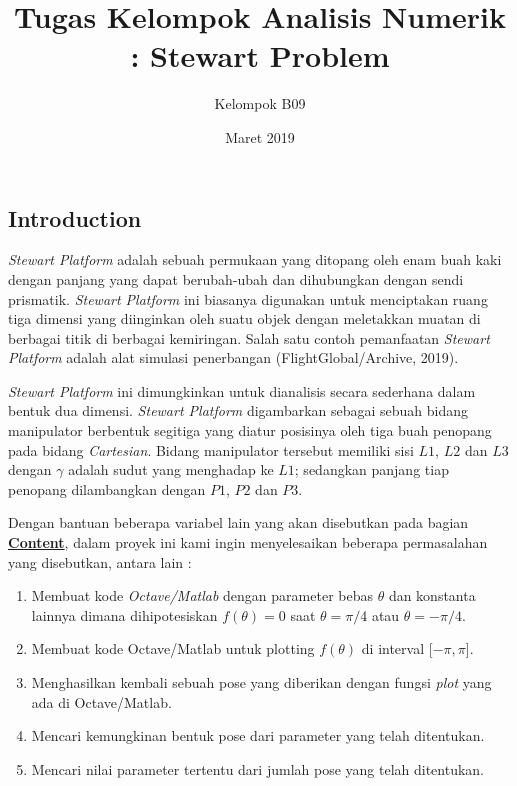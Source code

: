 \documentclass[11pt]{article}
\begin{document}
\author{Kelompok B09}
\title{Tugas Kelompok Analisis Numerik : Stewart Problem}
\date{Maret 2019}
\maketitle
\medskip

\begin{multicols}{2}
\section{Introduction}
\label{sec:Intro}
\textit{Stewart Platform} adalah sebuah permukaan yang ditopang oleh enam buah kaki dengan panjang yang dapat berubah-ubah dan dihubungkan dengan sendi prismatik. \textit{Stewart Platform} ini biasanya digunakan untuk menciptakan ruang tiga dimensi yang diinginkan oleh suatu objek dengan meletakkan muatan di berbagai titik di berbagai kemiringan. Salah satu contoh pemanfaatan \textit{Stewart Platform} adalah alat simulasi penerbangan (FlightGlobal/Archive, 2019).

\medskip

\textit{Stewart Platform} ini dimungkinkan untuk dianalisis secara sederhana dalam bentuk dua dimensi. \textit{Stewart Platform} digambarkan sebagai sebuah bidang manipulator berbentuk segitiga yang diatur posisinya oleh tiga buah penopang pada bidang \textit{Cartesian}. Bidang manipulator tersebut memiliki sisi $L1$, $L2$ dan $L3$ dengan $\gamma$ adalah sudut yang menghadap ke $L1$; sedangkan panjang tiap penopang dilambangkan dengan $P1$, $P2$ dan $P3$.

\medskip

Dengan bantuan beberapa variabel lain yang akan disebutkan pada bagian \hyperref[sec:Content]{\textbf{Content}}, dalam proyek ini kami ingin menyelesaikan beberapa permasalahan yang disebutkan, antara lain :
\begin{enumerate}
    \item Membuat kode \textit{Octave/Matlab}  dengan parameter bebas $\theta$ dan konstanta lainnya dimana dihipotesiskan $f(\theta) = 0$ saat $\theta = \pi/4$ atau $\theta = -\pi/4$.
    \item Membuat kode Octave/Matlab  untuk plotting $f(\theta)$ di interval [$-\pi, \pi$].
    \item Menghasilkan kembali sebuah pose yang diberikan dengan fungsi \textit{plot} yang ada di Octave/Matlab.
    \item Mencari kemungkinan bentuk pose dari parameter yang telah ditentukan.
    \item Mencari nilai parameter tertentu dari jumlah pose yang telah ditentukan.
\end{enumerate}



\end{multicols}
\end{document}
